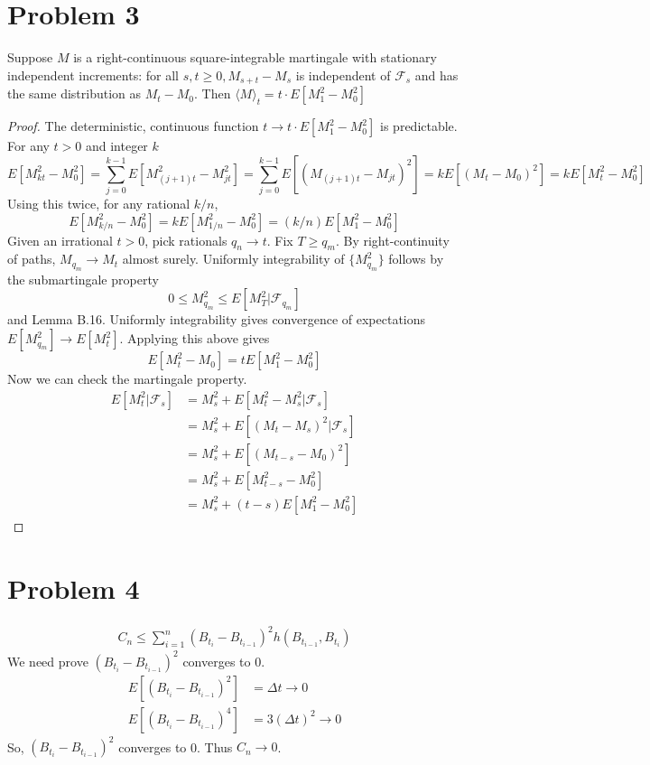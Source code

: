\documentclass{article}
\begin{document}
\section*{Problem 3}
Suppose $M$ is a right-continuous square-integrable martingale with stationary independent increments: for all $s, t \geqslant 0, M_{s+t}-M_s$ is independent of $\mathcal{F}_s$ and has the same distribution as $M_t-M_0$. Then $\langle M \rangle_t = t \cdot E[M_1^2 - M_0^2] $
\begin{proof}
	The deterministic, continuous function $t \to t \cdot E[M_1^2 - M_0^2]$ is predictable. For any $t>0$ and integer $k$
	$$E[M_{kt}^2 - M_0^2] = \sum_{j=0}^{k-1}E[M_{(j+1)t}^2 - M_{jt}^2] = \sum_{j=0}^{k-1}E[(M_{(j+1)t} - M_{jt})^2] = kE[(M_t - M_0)^2] = kE[M_t^2 - M_0^2]$$
	Using this twice, for any rational $k/n$,
	$$E[M_{k/n}^2 - M_0^2] = kE[M_{1/n}^2 - M_0^2] = (k/n)E[M_1^2 - M_0^2]$$
	Given an irrational $t>0$, pick rationals $q_n \to t$. Fix $T\geqslant q_m$. By right-continuity of paths, $M_{q_m} \to M_{t}$ almost surely. Uniformly integrability of $\{M_{q_m}^2\}$ follows by the submartingale property
	$$0\leqslant M_{q_m}^2 \leqslant E[M_{T}^2|\mathcal{F}_{q_m}]$$
	and Lemma B.16. Uniformly integrability gives convergence of expectations $E[M_{q_m}^2] \to E[M_{t}^2]$. Applying this above gives $$E[M_t^2 - M_0] = tE[M_1^2-M_0^2]$$
	Now we can check the martingale property.\begin{align*}
		E[M_t^2|\mathcal{F}_{s}] &= M_s^2+E[M_t^2-M_s^2|\mathcal{F}_{s}]\\
		& = M_s^2 + E[(M_t-M_s)^2|\mathcal{F}_s]\\
		& = M_s^2 + E[(M_{t-s} - M_0)^2]\\
		& = M_s^2 + E[M_{t-s}^2 - M_0^2]\\
		& = M_s^2 + (t-s)E[M_1^2-M_0^2]
	\end{align*}
\end{proof}

\section*{Problem 4}
	\begin{align*}
		C_n \leqslant \sum_{i=1}^n (B_{t_{i}}-B_{t_{i-1}})^2 h(B_{t_{i-1}}, B_{t_{i}})
	\end{align*}
	We need prove $(B_{t_{i}}-B_{t_{i-1}})^2$ converges to 0.
	\begin{align*}
		E[(B_{t_{i}}-B_{t_{i-1}})^2] &= \Delta t \to 0\\
		E[(B_{t_{i}}-B_{t_{i-1}})^4] &= 3(\Delta t)^2 \to 0
	\end{align*}
	So, $(B_{t_{i}}-B_{t_{i-1}})^2$ converges to 0. Thus $C_n \to 0$.
\end{document}
